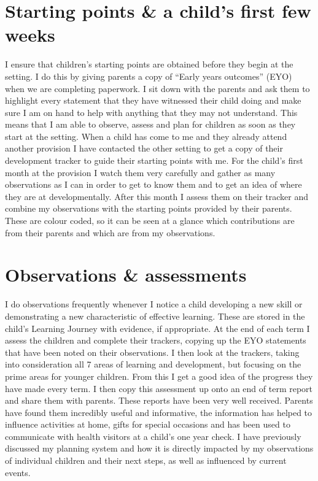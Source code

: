 \documentclass[10pt,a4paper]{report}
\makeatletter
\newcommand{\DESCRIPTION@original@item}{}
\let\DESCRIPTION@original@item\item
\newcommand*{\DESCRIPTION@envir}{DESCRIPTION}
\newlength{\DESCRIPTION@totalleftmargin}
\newlength{\DESCRIPTION@linewidth}
\newcommand{\DESCRIPTION@makelabel}[1]{\llap{#1}}%
\newcommand{\DESCRIPTION@item}[1][]{%
  \setlength{\@totalleftmargin}%
       {\DESCRIPTION@totalleftmargin+\widthof{\textbf{#1 }}-\leftmargin}%
  \setlength{\linewidth}
       {\DESCRIPTION@linewidth-\widthof{\textbf{#1 }}+\leftmargin}%
  \par\parshape \@ne \@totalleftmargin \linewidth
  \DESCRIPTION@original@item[\textbf{#1}]%
}
\newenvironment{DESCRIPTION}
  {\list{}{\setlength{\labelwidth}{0cm}%
           \let\makelabel\DESCRIPTION@makelabel}%
   \setlength{\DESCRIPTION@totalleftmargin}{\@totalleftmargin}%
   \setlength{\DESCRIPTION@linewidth}{\linewidth}%
   \renewcommand{\item}{\ifx\@currenvir\DESCRIPTION@envir
                           \expandafter\DESCRIPTION@item
                        \else
                           \expandafter\DESCRIPTION@original@item
                        \fi}}
  {\endlist}
\makeatother
\begin{document}
\begin{DESCRIPTION}
\begin{DESCRIPTION}
\section{Starting points \& a child's first few weeks}

I ensure that children's starting points are obtained before they begin at the setting. I do this by giving parents a copy of “Early years outcomes” (EYO) when we are completing paperwork. I sit down with the parents and ask them to highlight every statement that they have witnessed their child doing and make sure I am on hand to help with anything that they may not understand. This means that I am able to observe, assess and plan for children as soon as they start at the setting. When a child has come to me and they already attend another provision I have contacted the other setting to get a copy of their development tracker to guide their starting points with me. For the child's first month at the provision I watch them very carefully and gather as many observations as I can in order to get to know them and to get an idea of where they are at developmentally. After this month I assess them on their tracker and combine my observations with the starting points provided by their parents. These are colour coded, so it can be seen at a glance which contributions are from their parents and which are from my observations.

\section{Observations \& assessments}

I do observations frequently whenever I notice a child developing a new skill or demonstrating a new characteristic of effective learning. These are stored in the child's Learning Journey with evidence, if appropriate. At the end of each term I assess the children and complete their trackers, copying up the EYO statements that have been noted on their observations. I then look at the trackers, taking into consideration all 7 areas of learning and development, but focusing on the prime areas for younger children. From this I get a good idea of the progress they have made every term. I then copy this assessment up onto an end of term report and share them with parents. These reports have been very well received. Parents have found them incredibly useful and informative, the information has helped to influence activities at home, gifts for special occasions and has been used to communicate with health visitors at a child's one year check. I have previously discussed my planning system and how it is directly impacted by my observations of individual children and their next steps, as well as influenced by current events.


\end{DESCRIPTION}
\end{DESCRIPTION}
\end{document}
